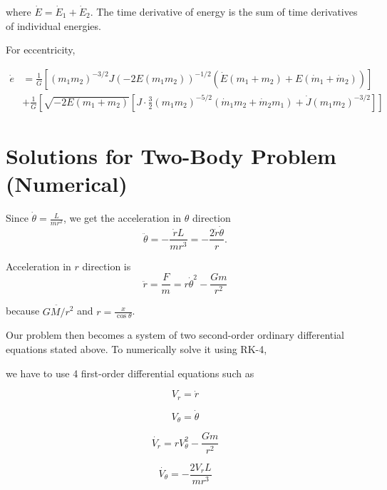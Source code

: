 \documentclass{article}
\begin{document}
where $\dot E = \dot E_1 + \dot E_2$. The time derivative of energy is the sum of time derivatives of individual energies.

For eccentricity,

\begin{equation}
    \begin{split}
        \dot e
        & = \frac{1}{G} \left[(m_1m_2)^{-3/2} J (-2E(m_1m_2))^{-1/2} (\dot E (m_1 + m_2) + E(\dot m_1 + \dot m_2)) \right] \\
        & + \frac{1}{G} \left[\sqrt{-2E(m_1 + m_2)} \left[ J \cdot \frac{3}{2} (m_1m_2)^{-5/2} (\dot m_1 m_2 + \dot m_2 m_1) + \dot J (m_1m_2)^{-3/2}\right]\right]
    \end{split}
\end{equation}



\section{Solutions for Two-Body Problem (Numerical)}

Since $\dot{\theta} = \frac{L}{mr^2}$, we get the acceleration in $\theta$ direction
\begin{equation}
    \ddot{\theta} = - \frac{\dot{r} L}{mr^3} = -\frac{2\dot{r}\dot{\theta}}{r}.
\end{equation}

Acceleration in $r$ direction is
\begin{equation}
    \ddot{r} = \frac{F}{m} = r \dot{\theta}^2 - \frac{Gm}{r^2}
\end{equation}

because $\ddot{GM/r^2}$ and $r = \frac{x}{\cos{\theta}}$.

Our problem then becomes a system of two second-order ordinary differential equations stated above.
To numerically solve it using RK-4,

we have to use 4 first-order differential equations such as 

\begin{equation}
    V_r = \dot{r}
\end{equation}

\begin{equation}
    V_\theta = \dot{\theta}
\end{equation}

\begin{equation}
    \dot{V_r} = r V_\theta ^2 - \frac{Gm}{r^2}
\end{equation}

\begin{equation}
    \dot{V_\theta} = - \frac{2V_r L}{mr^3} 
\end{equation}
\end{document}
